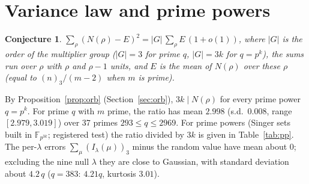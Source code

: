 \documentclass[11pt]{article}
\newtheorem{conjecture}{Conjecture}
\begin{document}
\section{Variance law and prime powers}
\begin{conjecture}\label{conj:var}
$\sum_{\rho}(N(\rho)-E)^2=|G|\,\sum_\rho E\,(1+o(1))$, where $|G|$ is the order of the multiplier group ($|G|=3$ for prime $q$, $|G|=3k$ for
$q=p^k$), the sums run over $\rho$ with $\rho$ and $\rho-1$ units, and $E$ is the mean of $N(\rho)$ over these $\rho$
(equal to $(n)_3/(m-2)$ when $m$ is prime).
\end{conjecture}
By Proposition~\ref{prop:orb} (Section~\ref{sec:orb}), $3k\mid N(\rho)$ for every prime power $q=p^k$. For prime $q$ with $m$ prime, the ratio has mean $2.998$ (s.d.\ $0.008$, range $[2.979,3.019]$) over 37 primes
$293\le q\le2969$. For prime powers (Singer sets built in $\mathbb F_{p^{3k}}$; registered test) the ratio divided by $3k$ is given in
Table~\ref{tab:pp}. The per-$\lambda$ errors $\sum_\mu(I_\lambda(\mu))_3$ minus the random value have mean about $0$; excluding the nine
null $\lambda$ they are close to Gaussian, with standard deviation about $4.2\,q$ ($q=383$: $4.21q$, kurtosis $3.01$).
\end{document}
